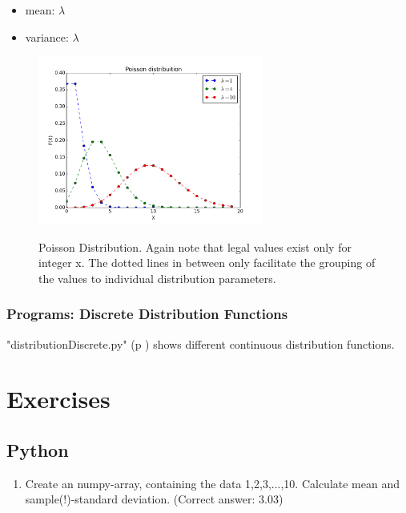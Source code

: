\begin{itemize}
    \item mean: $\lambda$
    \item variance: $\lambda$
\end{itemize}

\begin{figure}
  \centering
  \includegraphics[width=0.66\textwidth]{../Images/Poisson_distribution_pmf.png}\\
  \caption{Poisson Distribution. Again note that legal values exist only for integer x. The dotted lines in between only facilitate the grouping of the values to individual distribution parameters.}
\end{figure}

\subsubsection{Programs: Discrete Distribution Functions} 

\PyImg "distributionDiscrete.py" (p \pageref{py:discrete}) shows different continuous distribution functions.

\section{Exercises}

\subsection*{Python}
\begin{enumerate}
  \item Create an numpy-array, containing the data 1,2,3,...,10. Calculate mean and sample(!)-standard deviation.
    (Correct answer: 3.03)
\end{enumerate}

